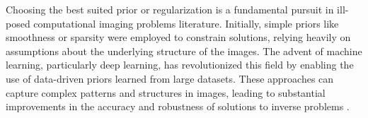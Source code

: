 \documentclass[linenumbers,twocolumn]{aastex7}
\begin{document}
Choosing the best suited prior or regularization is a fundamental pursuit in
ill-posed computational imaging problems literature. Initially, simple priors like
smoothness or sparsity were employed to constrain solutions, relying heavily on
assumptions about the underlying structure of the images. The advent of machine
learning, particularly deep learning, has revolutionized this field by enabling
the use of data-driven priors learned from large datasets. These approaches can
capture complex patterns and structures in images, leading to substantial
improvements in the accuracy and robustness of solutions to inverse problems
\citep{goodfellow2016deep, jin2017deep, ongie2020deep}.




\end{document}
